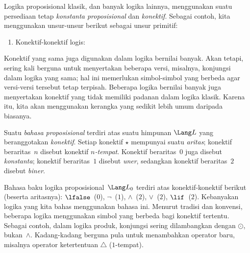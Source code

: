 \documentclass[../../../include/open-logic-section]{subfiles}
\begin{document}


Logika proposisional klasik, dan banyak logika lainnya, menggunakan suatu
persediaan tetap \emph{konstanta proposisional} dan \emph{konektif}.
Sebagai contoh, kita menggunakan unsur-unsur berikut sebagai unsur primitif:
\begin{enumerate}
\item Konektif-konektif logis:
  \startycommalist
\end{enumerate}

Konektif yang sama juga digunakan dalam logika bernilai banyak. Akan tetapi,
sering kali berguna untuk menyertakan beberapa versi, misalnya, konjungsi
dalam logika yang sama; hal ini memerlukan simbol-simbol yang berbeda agar
versi-versi tersebut tetap terpisah. Beberapa logika bernilai banyak juga
menyertakan konektif yang tidak memiliki padanan dalam logika klasik. Karena
itu, kita akan menggunakan kerangka yang sedikit lebih umum daripada biasanya.

\begin{defn}
  Suatu \emph{bahasa proposisional} terdiri atas suatu himpunan $\Lang L$
  yang beranggotakan \emph{konektif}. Setiap konektif $\star$ mempunyai suatu
  \emph{aritas}; konektif beraritas~$n$ disebut konektif \emph{$n$-tempat}.
  Konektif beraritas~$0$ juga disebut \emph{konstanta}; konektif
  beraritas~$1$ disebut \emph{uner}, sedangkan konektif beraritas~$2$
  disebut \emph{biner}.
\end{defn}

\begin{ex}
  Bahasa baku logika proposisional~$\Lang L_0$ terdiri atas konektif-konektif
  berikut (beserta aritasnya):
  $\lfalse$~($0$),
  $\lnot$~($1$),
  $\land$~($2$),
  $\lor$~($2$),
  $\lif$~($2$). Kebanyakan logika yang kita bahas menggunakan bahasa ini.
  Menurut tradisi dan konvensi, beberapa logika menggunakan simbol yang
  berbeda bagi konektif tertentu. Sebagai contoh, dalam logika produk,
  konjungsi sering dilambangkan dengan $\odot$, bukan~$\land$. Kadang-kadang
  berguna pula untuk menambahkan operator baru, misalnya operator ketertentuan
  $\triangle$ ($1$-tempat).
\end{ex}
\end{document}
